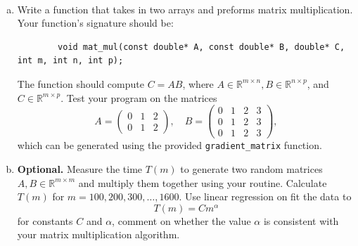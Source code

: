 \documentclass{article}
\def\rr{{\mathbb R}}
\begin{document}
\begin{problem} \\ 
    \begin{enumerate}[a)]
        \item Write a function that takes in two arrays and preforms matrix multiplication. \\
    Your function's signature should be:
    \begin{verbatim}
        void mat_mul(const double* A, const double* B, double* C, int m, int n, int p);
    \end{verbatim}
    The function should compute $C = AB$, where $A \in \rr^{m\times n}, B \in \rr^{n \times p}$, and $C \in \rr^{m \times p}$. Test your program on the matrices
    \[
        A = \begin{pmatrix}
            0 & 1 & 2 \\
            0 & 1 & 2 
        \end{pmatrix},
        \quad 
        B = \begin{pmatrix}
            0 & 1 & 2 & 3 \\
            0 & 1 & 2 & 3 \\
            0 & 1 & 2 & 3 
        \end{pmatrix},
    \]
    which can be generated using the provided \verb|gradient_matrix| function.
    \item \textbf{Optional.} Measure the time $T(m)$ to generate two random matrices $A, B \in \rr^{m\times m}$ and multiply them together using your routine. Calculate $T(m)$ for $m = 100, 200, 300, \dots , 1600$. Use linear regression on fit the data to 
    \[
        T(m) = Cm^\alpha
    \] 
    for constants $C$ and $\alpha$, comment on whether the value $\alpha$ is consistent with your matrix multiplication algorithm.
    \end{enumerate}
    
    
\end{problem}
\end{document}
